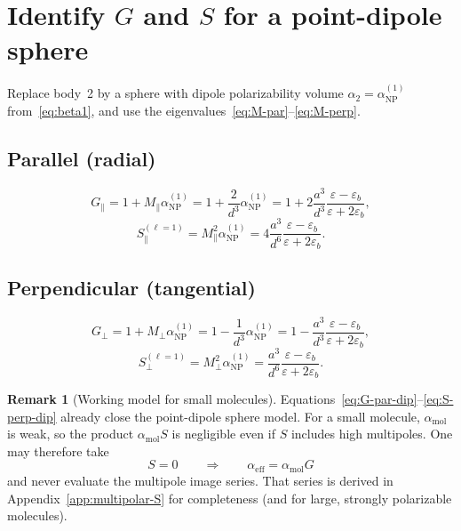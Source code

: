 \documentclass[11pt,a4paper]{article}
\theoremstyle{definition}
\newtheorem{remark}{Remark}[section]
\newcommand{\epsb}{\varepsilon_b}
\newcommand{\epsm}{\varepsilon}
\newcommand{\alpham}{\alpha_{\text{mol}}}
\newcommand{\alphanp}{\alpha_{\text{NP}}}
\newcommand{\alphaeff}{\alpha_{\mathrm{eff}}}
\begin{document}
\section{Identify $G$ and $S$ for a point-dipole sphere}

\noindent
Replace body~2 by a sphere with dipole polarizability volume $\alpha_2=\alphanp^{(1)}$ from~\eqref{eq:beta1}, and use the eigenvalues~\eqref{eq:M-par}--\eqref{eq:M-perp}.

\subsection{Parallel (radial)}

\begin{equation}
  G_\parallel
  =
  1 + M_\parallel\alphanp^{(1)}
  =
  1 + \frac{2}{d^3}\alphanp^{(1)}
  =
  1 + 2 \frac{a^3}{d^3} 
      \frac{\epsm-\epsb}{\epsm+2\epsb} ,
  \label{eq:G-par-dip}
\end{equation}
\begin{equation}
  S_\parallel^{(\ell=1)}
  =
  M_\parallel^2\alphanp^{(1)}
  =
  4\frac{a^3}{d^6}\frac{\epsm-\epsb}{\epsm+2\epsb} .
  \label{eq:S-par-dip}
\end{equation}

\subsection{Perpendicular (tangential)}

\begin{equation}
  G_\perp
  =
  1 + M_\perp\alphanp^{(1)}
  =
  1 - \frac{1}{d^3}\alphanp^{(1)}
  =
  1 - \frac{a^3}{d^3} 
      \frac{\epsm-\epsb}{\epsm+2\epsb} ,
  \label{eq:G-perp-dip}
\end{equation}
\begin{equation}
  S_\perp^{(\ell=1)}
  =
  M_\perp^2\alphanp^{(1)}
  =
  \frac{a^3}{d^6}\frac{\epsm-\epsb}{\epsm+2\epsb} .
  \label{eq:S-perp-dip}
\end{equation}

\begin{remark}[Working model for small molecules]
\noindent
Equations~\eqref{eq:G-par-dip}--\eqref{eq:S-perp-dip} already close the point-dipole sphere model. For a small molecule, $\alpham$ is weak, so the product $\alpham S$ is negligible even if $S$ includes high multipoles. One may therefore take
\begin{equation}
  S=0
  \qquad\Rightarrow\qquad
  \alphaeff = \alpham G
  \label{eq:alphaeff-S0}
\end{equation}
and never evaluate the multipole image series. That series is derived in Appendix~\ref{app:multipolar-S} for completeness (and for large, strongly polarizable molecules).
\end{remark}
\end{document}
